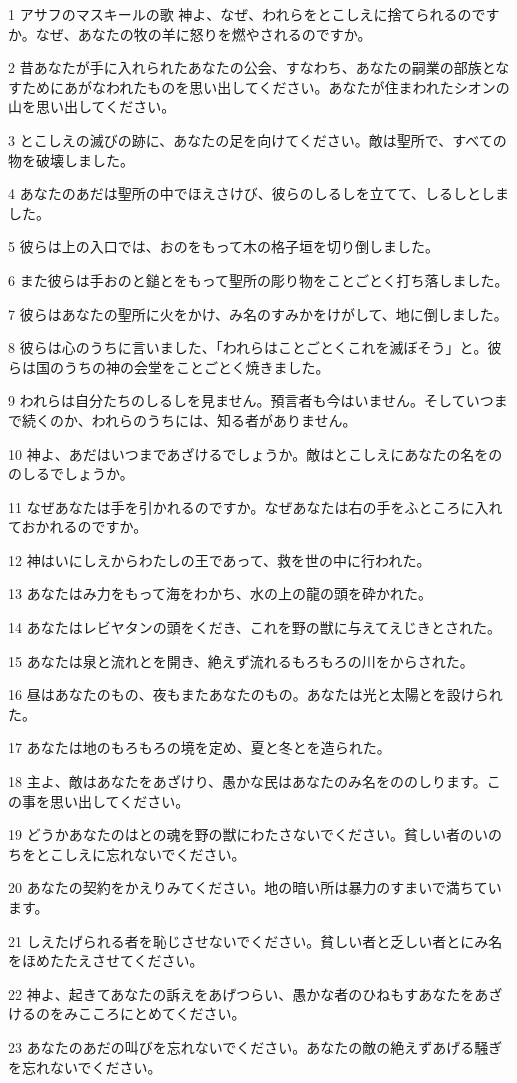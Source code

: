 \par 1 アサフのマスキールの歌 神よ、なぜ、われらをとこしえに捨てられるのですか。なぜ、あなたの牧の羊に怒りを燃やされるのですか。
\par 2 昔あなたが手に入れられたあなたの公会、すなわち、あなたの嗣業の部族となすためにあがなわれたものを思い出してください。あなたが住まわれたシオンの山を思い出してください。
\par 3 とこしえの滅びの跡に、あなたの足を向けてください。敵は聖所で、すべての物を破壊しました。
\par 4 あなたのあだは聖所の中でほえさけび、彼らのしるしを立てて、しるしとしました。
\par 5 彼らは上の入口では、おのをもって木の格子垣を切り倒しました。
\par 6 また彼らは手おのと鎚とをもって聖所の彫り物をことごとく打ち落しました。
\par 7 彼らはあなたの聖所に火をかけ、み名のすみかをけがして、地に倒しました。
\par 8 彼らは心のうちに言いました、「われらはことごとくこれを滅ぼそう」と。彼らは国のうちの神の会堂をことごとく焼きました。
\par 9 われらは自分たちのしるしを見ません。預言者も今はいません。そしていつまで続くのか、われらのうちには、知る者がありません。
\par 10 神よ、あだはいつまであざけるでしょうか。敵はとこしえにあなたの名をののしるでしょうか。
\par 11 なぜあなたは手を引かれるのですか。なぜあなたは右の手をふところに入れておかれるのですか。
\par 12 神はいにしえからわたしの王であって、救を世の中に行われた。
\par 13 あなたはみ力をもって海をわかち、水の上の龍の頭を砕かれた。
\par 14 あなたはレビヤタンの頭をくだき、これを野の獣に与えてえじきとされた。
\par 15 あなたは泉と流れとを開き、絶えず流れるもろもろの川をからされた。
\par 16 昼はあなたのもの、夜もまたあなたのもの。あなたは光と太陽とを設けられた。
\par 17 あなたは地のもろもろの境を定め、夏と冬とを造られた。
\par 18 主よ、敵はあなたをあざけり、愚かな民はあなたのみ名をののしります。この事を思い出してください。
\par 19 どうかあなたのはとの魂を野の獣にわたさないでください。貧しい者のいのちをとこしえに忘れないでください。
\par 20 あなたの契約をかえりみてください。地の暗い所は暴力のすまいで満ちています。
\par 21 しえたげられる者を恥じさせないでください。貧しい者と乏しい者とにみ名をほめたたえさせてください。
\par 22 神よ、起きてあなたの訴えをあげつらい、愚かな者のひねもすあなたをあざけるのをみこころにとめてください。
\par 23 あなたのあだの叫びを忘れないでください。あなたの敵の絶えずあげる騒ぎを忘れないでください。

